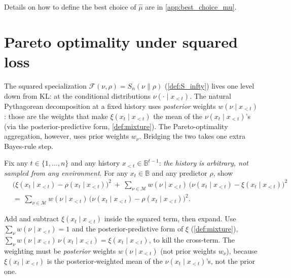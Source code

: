 \documentclass[fontsize=11pt, parskip=half]{scrartcl}
\newcommand{\Mc}{\mathcal{M}}
\newcommand{\Sn}[2]{S_{n}(#1 \parallel #2)}
\begin{document}
Details on how to define the best choice of $\hat{\mu}$ are in \cref{app:best_choice_mu}.

\section{Pareto optimality under squared loss}\label{prob:sq}

The squared specialization $\mathcal F(\nu, \rho) = \Sn{\nu}{\rho}$ (\cref{def:S_infty}) lives one level down from KL: at the conditional distributions
$\nu(\cdot \mid x_{<t})$. The natural Pythagorean decomposition at a fixed
history uses \emph{posterior} weights $w(\nu \mid x_{<t})$: those are the
weights that make $\xi(x_t \mid x_{<t})$ the mean of the $\nu(x_t \mid x_{<t})$'s
(via the posterior-predictive form, \cref{def:mixture}). The Pareto-optimality
aggregation, however, uses prior weights $w_\nu$. Bridging the two takes one
extra Bayes-rule step.

\begin{exercise}
\label{prob:sq_pythag}



Fix any $t \in \{1, \dots, n\}$ and any history $x_{<t} \in \mathbb{B}^{t-1}$:
\emph{the history is arbitrary, not sampled from any environment}. For any
$x_t \in \mathbb{B}$ and any predictor $\rho$, show
\begin{align*}
  &\bigl(\xi(x_t \mid x_{<t}) - \rho(x_t \mid x_{<t})\bigr)^{2}
  ~+~
  \sum_{\nu \in \Mc} w(\nu \mid x_{<t})\,\bigl(\nu(x_t \mid x_{<t}) - \xi(x_t \mid x_{<t})\bigr)^{2} \\
  &=~
  \sum_{\nu \in \Mc} w(\nu \mid x_{<t})\,\bigl(\nu(x_t \mid x_{<t}) - \rho(x_t \mid x_{<t})\bigr)^{2}.
\end{align*}

\begin{hint}
Add and subtract $\xi(x_t \mid x_{<t})$ inside the squared term,
then expand. Use $\sum_\nu w(\nu \mid x_{<t}) = 1$ and the posterior-predictive
form of $\xi$ (\cref{def:mixture}), $\sum_\nu w(\nu \mid x_{<t})\,\nu(x_t \mid x_{<t})
= \xi(x_t \mid x_{<t})$, to kill the cross-term. The weighting must be
\emph{posterior} weights $w(\nu \mid x_{<t})$ (not prior weights $w_\nu$),
because $\xi(x_t \mid x_{<t})$ is the posterior-weighted mean of the
$\nu(x_t \mid x_{<t})$'s, not the prior one.
\end{hint}
\end{exercise}
\end{document}
